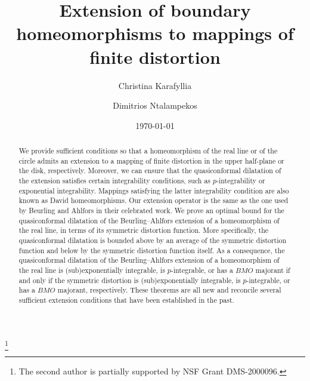 \documentclass{amsart}
\theoremstyle{plain}
\theoremstyle{definition}
\theoremstyle{remark}
\numberwithin{equation}{section}
\numberwithin{theorem}{section}
\numberwithin{conjecture}{section}
\newcommand{\1}{\mathbf 1}
\begin{document}
\title[Extension of boundary maps to mappings of finite distortion]{Extension of boundary homeomorphisms to mappings of finite distortion}


\author{Christina Karafyllia}
\author{Dimitrios Ntalampekos}
\address{Institute for Mathematical Sciences, Stony Brook University, Stony Brook, NY 11794, USA.}

\thanks{The second author is partially supported by NSF Grant DMS-2000096.}



\date{\today}

\begin{abstract}
We provide sufficient conditions so that a homeomorphism of the real line or of the circle admits an extension to a mapping of finite distortion in the upper half-plane or the disk, respectively. Moreover, we can ensure that the quasiconformal dilatation of the extension satisfies certain integrability conditions, such as $p$-integrability or exponential integrability. Mappings satisfying the latter integrability condition are also known as David homeomorphisms. Our extension operator is the same as the one used by Beurling and Ahlfors in their celebrated work. We prove an optimal bound for the quasiconformal dilatation of the Beurling--Ahlfors extension of a homeomorphism of the real line, in terms of its symmetric distortion function. More specifically, the quasiconformal dilatation is bounded above by an average of the symmetric distortion function and below by the symmetric distortion function itself. As a consequence, the quasiconformal dilatation of the Beurling--Ahlfors extension of a homeomorphism of the real line is (sub)exponentially integrable, is $p$-integrable, or has a $BMO$ majorant  if and only if the symmetric distortion is (sub)exponentially integrable, is $p$-integrable, or has a $BMO$ majorant, respectively.  These theorems are all new and  reconcile several sufficient extension conditions that have been established in the past.


\end{abstract}

\maketitle
\end{document}
